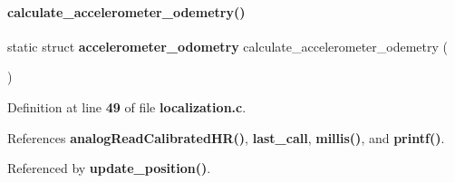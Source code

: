 \paragraph{calculate\+\_\+accelerometer\+\_\+odemetry()}
{\footnotesize\ttfamily static struct \textbf{ accelerometer\+\_\+odometry} calculate\+\_\+accelerometer\+\_\+odemetry (\begin{DoxyParamCaption}{ }\end{DoxyParamCaption})\hspace{0.3cm}{\ttfamily [static]}}



Definition at line \textbf{ 49} of file \textbf{ localization.\+c}.



References \textbf{ analog\+Read\+Calibrated\+H\+R()}, \textbf{ last\+\_\+call}, \textbf{ millis()}, and \textbf{ printf()}.



Referenced by \textbf{ update\+\_\+position()}.



